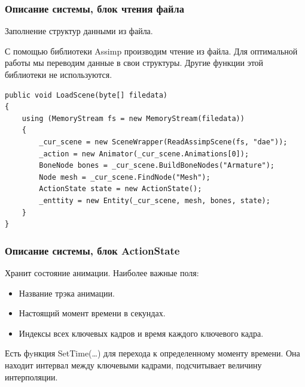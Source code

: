 \documentclass{beamer}
\begin{document}
\begin{frame}[fragile]
\frametitle{Описание системы, блок чтения файла}
	Заполнение структур данными из файла.
	    
    \smallskip
	С помощью библиотеки Assimp производим чтение из файла. Для оптимальной работы мы переводим данные в свои структуры. Другие функции этой библиотеки не используются.
	
\begin{scriptsize}
\begin{lstlisting}
public void LoadScene(byte[] filedata)
{
    using (MemoryStream fs = new MemoryStream(filedata))
    {
        _cur_scene = new SceneWrapper(ReadAssimpScene(fs, "dae"));
        _action = new Animator(_cur_scene.Animations[0]);
        BoneNode bones = _cur_scene.BuildBoneNodes("Armature");
        Node mesh = _cur_scene.FindNode("Mesh");
        ActionState state = new ActionState();
        _enttity = new Entity(_cur_scene, mesh, bones, state);
    }
}
\end{lstlisting}
\end{scriptsize}
		
\end{frame}



\begin{frame}
\frametitle{Описание системы, блок ActionState}	
	Хранит состояние анимации. Наиболее важные поля:
\begin{itemize}        
    \item Название трэка анимации.
	\item Настоящий момент времени в секундах.
	\item Индексы всех ключевых кадров и время каждого ключевого кадра.
\end{itemize}

    Есть фyнкция SetTime(\dots) для перехода к определенному моменту времени. Она находит интервал между ключевыми кадрами, подсчитывает величину интерполяции.
\end{frame}
\end{document}
